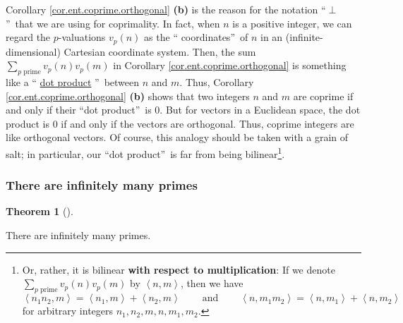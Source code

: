 \documentclass[numbers=enddot,12pt,final,onecolumn,notitlepage]{scrartcl}%
\numberwithin{exer}{subsection}
\theoremstyle{definition}
\newtheorem{theo}{Theorem}[subsection]
\newenvironment{theorem}[1][]
{\begin{theo}[#1]\begin{leftbar}}
{\end{leftbar}\end{theo}}
\let\sumnonlimits\sum
\renewcommand{\sum}{\sumnonlimits\limits}
\begin{document}
Corollary \ref{cor.ent.coprime.orthogonal} \textbf{(b)} is the reason for the
notation \textquotedblleft$\perp$\textquotedblright\ that we are using for
coprimality. In fact, when $n$ is a positive integer, we can regard the
$p$-valuations $v_{p}\left(  n\right)  $ as the \textquotedblleft
coordinates\textquotedblright\ of $n$ in an (infinite-dimensional) Cartesian
coordinate system. Then, the sum $\sum_{p\text{ prime}}v_{p}\left(  n\right)
v_{p}\left(  m\right)  $ in Corollary \ref{cor.ent.coprime.orthogonal} is
something like a \textquotedblleft%
\href{https://en.wikipedia.org/wiki/Dot_product}{dot product}%
\textquotedblright\ between $n$ and $m$. Thus, Corollary
\ref{cor.ent.coprime.orthogonal} \textbf{(b)} shows that two integers $n$ and
$m$ are coprime if and only if their \textquotedblleft dot
product\textquotedblright\ is $0$. But for vectors in a Euclidean space, the
dot product is $0$ if and only if the vectors are orthogonal. Thus, coprime
integers are like orthogonal vectors. Of course, this analogy should be taken
with a grain of salt; in particular, our \textquotedblleft dot
product\textquotedblright\ is far from being bilinear\footnote{Or, rather, it
is bilinear \textbf{with respect to multiplication}: If we denote
$\sum_{p\text{ prime}}v_{p}\left(  n\right)  v_{p}\left(  m\right)  $ by
$\left\langle n,m\right\rangle $, then we have%
\[
\left\langle n_{1}n_{2},m\right\rangle =\left\langle n_{1},m\right\rangle
+\left\langle n_{2},m\right\rangle \ \ \ \ \ \ \ \ \ \ \text{and}%
\ \ \ \ \ \ \ \ \ \ \left\langle n,m_{1}m_{2}\right\rangle =\left\langle
n,m_{1}\right\rangle +\left\langle n,m_{2}\right\rangle
\]
for arbitrary integers $n_{1},n_{2},m,n,m_{1},m_{2}$.}.

\subsubsection{There are infinitely many primes}

\begin{theorem}
\label{thm.ent.prime.infin}There are infinitely many primes.
\end{theorem}
\end{document}
